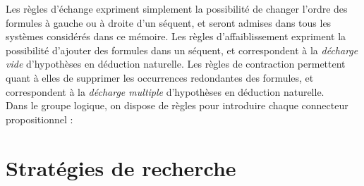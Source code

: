 \documentclass[11pt]{report}
\newcommand{\lto}{\Rightarrow}
\newcommand{\seq}{\vdash}
\newcommand{\irule}[1]{\footnotesize$#1$}
\newcommand{\iruleL}[1]{\irule{{#1}\seq}}
\newcommand{\iruleR}[1]{\irule{\seq{#1}}}
\begin{document}
Les règles d’échange expriment simplement la possibilité de changer l’ordre des formules à gauche ou à droite d’un séquent, et seront admises dans tous les systèmes considérés dans ce mémoire. Les règles d’affaiblissement expriment la possibilité d’ajouter des formules dans un séquent, et correspondent à la \emph{décharge vide} d’hypothèses en déduction naturelle. Les règles de contraction permettent quant à elles de supprimer les occurrences redondantes des formules, et correspondent à la \emph{décharge multiple} d’hypothèses en déduction naturelle.\\

Dans le groupe logique, on dispose de règles pour introduire chaque connecteur propositionnel :


\chapter{Stratégies de recherche}
\end{document}
